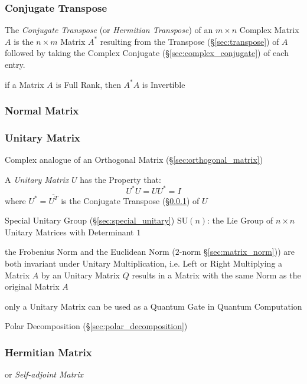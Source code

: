 \subsubsection{Conjugate Transpose}\label{sec:conjugate_transpose}

The \emph{Conjugate Transpose} (or \emph{Hermitian Transpose}) of an $m \times
n$ Complex Matrix $A$ is the $n \times m$ Matrix $A^*$ resulting from the
Transpose (\S\ref{sec:transpose}) of $A$ followed by taking the Complex
Conjugate (\S\ref{sec:complex_conjugate}) of each entry.

if a Matrix $A$ is Full Rank, then $A^*A$ is Invertible



\subsubsection{Normal Matrix}\label{sec:normal_matrix}

\subsubsection{Unitary Matrix}\label{sec:unitary_matrix}

Complex analogue of an Orthogonal Matrix (\S\ref{sec:orthogonal_matrix})

A \emph{Unitary Matrix} $U$ has the Property that:
\[
  U^*U = UU^* = I
\]
where $U^* = \overline{U^T}$ is the Conjugate Transpose
(\S\ref{sec:conjugate_transpose}) of $U$

\fist Special Unitary Group (\S\ref{sec:special_unitary})
$\mathrm{SU}(n)$: the Lie Group of $n \times n$ Unitary Matrices with
Determinant $1$

the Frobenius Norm and the Euclidean Norm ($2$-norm \S\ref{sec:matrix_norm}))
are both invariant under Unitary Multiplication, i.e. Left or Right Multiplying
a Matrix $A$ by an Unitary Matrix $Q$ results in a Matrix with the same Norm as
the original Matrix $A$

only a Unitary Matrix can be used as a Quantum Gate in Quantum Computation

Polar Decomposition (\S\ref{sec:polar_decomposition})



\subsubsection{Hermitian Matrix}\label{sec:hermitian_matrix}

or \emph{Self-adjoint Matrix}

